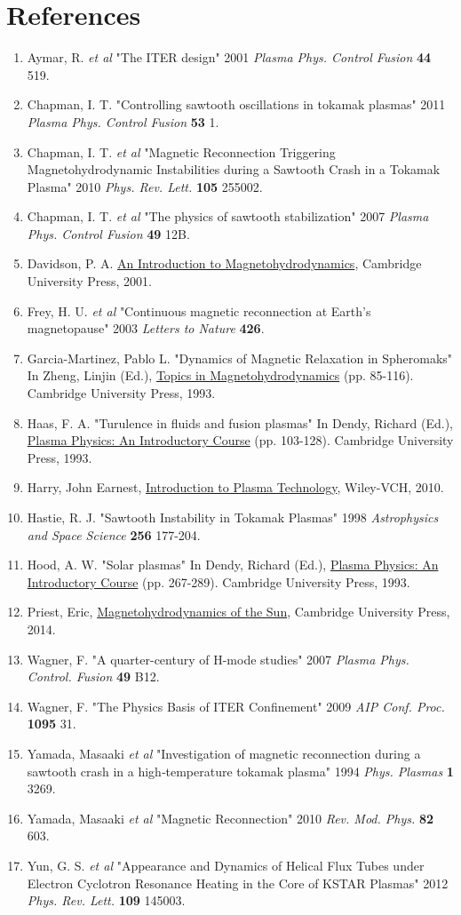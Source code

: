\documentclass{article}
\begin{document}
\section{References}
\begin{enumerate}
\item Aymar, R. \textit{et al} "The ITER design" 2001 \textit{Plasma Phys. Control Fusion} \textbf{44} 519.
\item Chapman, I. T. "Controlling sawtooth oscillations in tokamak plasmas" 2011 \textit{Plasma Phys. Control Fusion} \textbf{53} 1.
\item Chapman, I. T. \textit{et al} "Magnetic Reconnection Triggering Magnetohydrodynamic Instabilities during a Sawtooth Crash in a Tokamak Plasma" 2010 \textit{Phys. Rev. Lett.} \textbf{105} 255002.
\item Chapman, I. T. \textit{et al} "The physics of sawtooth stabilization" 2007 \textit{Plasma Phys. Control Fusion} \textbf{49} 12B.
\item Davidson, P. A. \underline{An Introduction to Magnetohydrodynamics}, Cambridge University Press, 2001.
\item Frey, H. U. \textit{et al} "Continuous magnetic reconnection at Earth's magnetopause" 2003 \textit{Letters to Nature} \textbf{426}.
\item Garcia-Martinez, Pablo L. "Dynamics of Magnetic Relaxation in Spheromaks" In Zheng, Linjin (Ed.), \underline{Topics in Magnetohydrodynamics} (pp. 85-116). Cambridge University Press, 1993.
\item Haas, F. A. "Turulence in fluids and fusion plasmas" In Dendy, Richard (Ed.), \underline{Plasma Physics: An Introductory Course} (pp. 103-128). Cambridge University Press, 1993.
\item Harry, John Earnest,  \underline{Introduction to Plasma Technology}, Wiley-VCH, 2010.
\item Hastie, R. J. "Sawtooth Instability in Tokamak Plasmas" 1998 \textit{Astrophysics and Space Science} \textbf{256} 177-204.
\item Hood, A. W. "Solar plasmas" In Dendy, Richard (Ed.), \underline{Plasma Physics: An Introductory Course} (pp. 267-289). Cambridge University Press, 1993.
\item Priest, Eric,  \underline{Magnetohydrodynamics of the Sun},  Cambridge University Press, 2014.
\item Wagner, F. "A quarter-century of H-mode studies" 2007 \textit{Plasma Phys. Control. Fusion} \textbf{49} B12.
\item Wagner, F. "The Physics Basis of ITER Confinement" 2009 \textit{AIP Conf. Proc.} \textbf{1095} 31.
\item Yamada, Masaaki \textit{et al} "Investigation of magnetic reconnection during a sawtooth crash in a high‐temperature tokamak plasma" 1994 \textit{Phys. Plasmas} \textbf{1} 3269.
\item Yamada, Masaaki \textit{et al} "Magnetic Reconnection" 2010 \textit{Rev. Mod. Phys.} \textbf{82} 603.
\item Yun, G. S. \textit{et al} "Appearance and Dynamics of Helical Flux Tubes under Electron Cyclotron Resonance Heating in the Core of KSTAR Plasmas" 2012 \textit{Phys. Rev. Lett.} \textbf{109} 145003.
\end{enumerate}
\end{document}
